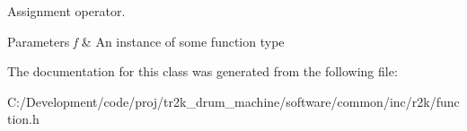 Assignment operator. 


\begin{DoxyParams}{Parameters}
{\em f} & An instance of some function type \\
\hline
\end{DoxyParams}


The documentation for this class was generated from the following file\+:\begin{DoxyCompactItemize}
\item 
C\+:/\+Development/code/proj/tr2k\+\_\+drum\+\_\+machine/software/common/inc/r2k/function.\+h\end{DoxyCompactItemize}
